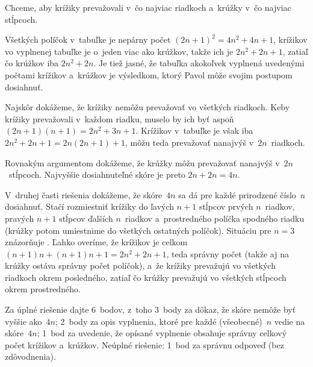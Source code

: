 {%
Chceme, aby krížiky prevažovali v~čo najviac riadkoch
a~krúžky v~čo najviac stĺpcoch.

Všetkých políčok v~tabuľke je nepárny počet $(2n+1)^2=4n^2+4n+1$,
krížikov vo vyplnenej tabuľke je o~jeden viac ako krúžkov, takže ich
je $2n^2+2n+1$, zatiaľ čo krúžkov iba $2n^2+2n$. Je tiež jasné,
že tabuľka akokoľvek vyplnená uvedenými počtami krížikov a~krúžkov je výsledkom,
ktorý Pavol môže svojim postupom dosiahnuť.

Najskôr dokážeme, že krížiky nemôžu prevažovať vo všetkých riadkoch. Keby
krížiky prevažovali v~každom riadku, muselo by ich byť aspoň
$(2n+1)(n+1)=2n^2+3n+1$. Krížikov v~tabuľke je však iba
$2n^2+2n+1=2n(2n+1)+1$, môžu teda prevažovať nanajvýš v~$2n$~riadkoch.

Rovnakým argumentom dokážeme, že krúžky môžu prevažovať nanajvýš v~$2n$~stĺpcoch.
Najvyššie dosiahnuteľné skóre je preto $2n+2n=4n$.

V~druhej časti riešenia dokážeme, že skóre~$4n$ sa dá pre každé prirodzené číslo~$n$
dosiahnuť. Stačí rozmiestniť krížiky do ľavých $n+1$ stĺpcov
prvých $n$~riadkov, pravých $n+1$ stĺpcov ďalších $n$~riadkov
a~prostredného políčka spodného riadku (krúžky potom umiestnime do všetkých
ostatných políčok). Situáciu pre $n=3$ znázorňuje \obr. Ľahko overíme, že
krížikov je celkom $(n+1) n + (n+1) n+1=2n^2+2n+1$, teda správny počet
(takže aj na krúžky ostáva správny počet políčok), a~že krížiky
prevažujú vo všetkých riadkoch okrem posledného, zatiaľ čo krúžky prevažujú
vo všetkých stĺpcoch okrem prostredného.
%

\nobreak\medskip\petit\noindent
Za úplné riešenie dajte 6~bodov, z~toho
3~body za dôkaz, že skóre nemôže byť vyššie ako~$4n$;
2~body za opis vyplnenia, ktoré pre každé (všeobecné)~$n$ vedie na skóre~$4n$;
1~bod za uvedenie, že opísané vyplnenie obsahuje správny celkový počet
krížikov a~krúžkov.
Neúplné riešenie:
1~bod za správnu odpoveď (bez zdôvodnenia).
\endpetit
\bigbreak
}

